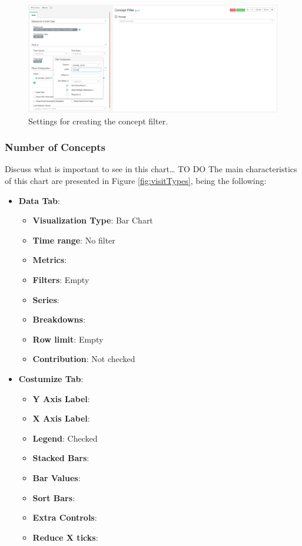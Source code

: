 \documentclass[
]{book}
\providecommand{\tightlist}{%
  \setlength{\itemsep}{0pt}\setlength{\parskip}{0pt}}
\begin{document}
\begin{figure}
\includegraphics[width=1\linewidth]{images/conceptFilter} \caption{Settings for creating the concept filter.}\label{fig:conceptFilter}
\end{figure}

\hypertarget{number-of-concepts}{%
\subsubsection{Number of Concepts}\label{number-of-concepts}}

Discuss what is important to see in this chart\ldots{} TO DO
The main characteristics of this chart are presented in Figure \ref{fig:visitTypes}, being the following:

\begin{itemize}
\tightlist
\item
  \textbf{Data Tab}:

  \begin{itemize}
  \tightlist
  \item
    \textbf{Visualization Type}: Bar Chart
  \item
    \textbf{Time range}: No filter
  \item
    \textbf{Metrics}:
  \item
    \textbf{Filters}: Empty
  \item
    \textbf{Series}:
  \item
    \textbf{Breakdowns}:
  \item
    \textbf{Row limit}: Empty
  \item
    \textbf{Contribution}: Not checked
  \end{itemize}
\item
  \textbf{Costumize Tab}:

  \begin{itemize}
  \tightlist
  \item
    \textbf{Y Axis Label}:
  \item
    \textbf{X Axis Label}:
  \item
    \textbf{Legend}: Checked
  \item
    \textbf{Stacked Bars}:
  \item
    \textbf{Bar Values}:
  \item
    \textbf{Sort Bars}:
  \item
    \textbf{Extra Controls}:
  \item
    \textbf{Reduce X ticks}:
  \end{itemize}
\end{itemize}
\end{document}
